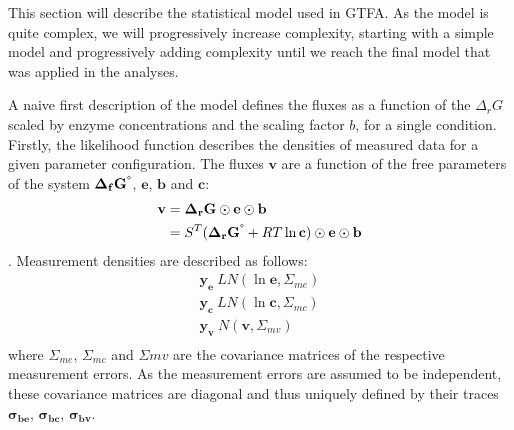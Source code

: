 \documentclass[10pt,letterpaper]{article}
\newcommand{\sdgf}{\Delta_fG^{\degree}}
\newcommand{\dgr}{\Delta_rG}
\newcommand{\sdgr}{\Delta_rG^{\degree}}
\newcommand{\bsdgf}{\mathbf{\sdgf}}
\newcommand{\bdgr}{\mathbf{\dgr}}
\newcommand{\bsdgr}{\mathbf{\sdgr}}
\newcommand{\be}{\mathbf{e}}
\newcommand{\bc}{\mathbf{c}}
\newcommand{\bb}{\mathbf{b}}
\newcommand{\bv}{\mathbf{v}}
\begin{document}
This section will describe the statistical model used in GTFA.
As the model is quite complex, we will progressively increase complexity, starting with a simple model and progressively adding complexity until we reach the final model that was applied in the analyses.

A naive first description of the model defines the fluxes as a function of the $\dgr$ scaled by enzyme concentrations and the scaling factor $b$, for a single condition.
Firstly, the likelihood function describes the densities of measured data for a given parameter configuration.
The fluxes $\bv$ are a function of the free parameters of the system $\bsdgf$, $\be$, $\bb$ and $\bc$:
\begin{align}
    \bv &= \bdgr \odot \be \odot \bb \\
        &= S^T (\bsdgr + RT\ln{\bc}) \odot \be \odot \bb \\
\end{align}
.
Measurement densities are described as follows:
\begin{align*}
    \mathbf{y_{e}} ~ LN(\ln{\be}, \Sigma_{me}) \\
    \mathbf{y_{c}} ~ LN(\ln{\bc}, \Sigma_{mc}) \\
    \mathbf{y_{v}} ~ N(\bv, \Sigma_{mv}) \\
\end{align*}
where $\Sigma_{me}$, $\Sigma_{mc}$ and $\Sigma{mv}$ are the covariance matrices of the respective measurement errors.
As the measurement errors are assumed to be independent, these covariance matrices are diagonal and thus uniquely defined by their traces $\mathbf{\sigma_{be}}$, $\mathbf{\sigma_{bc}}$, $\mathbf{\sigma_{bv}}$.
\end{document}
